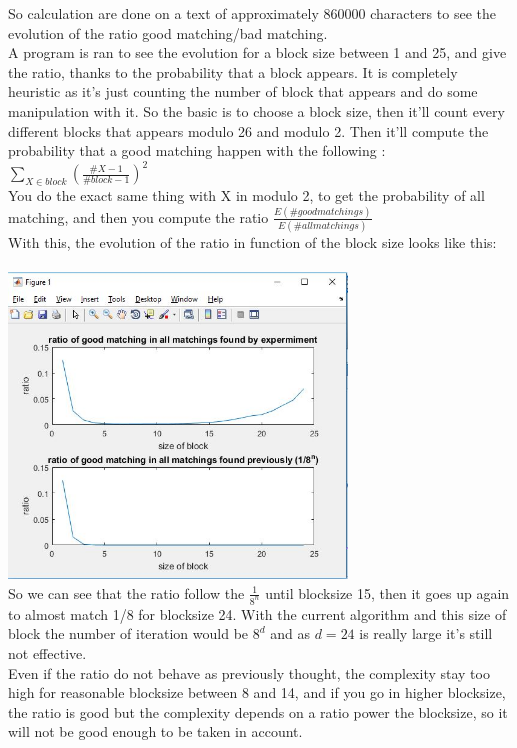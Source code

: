 \documentclass{article}
\begin{document}
So calculation are done on a text of approximately $860000$ characters to see the evolution of the ratio good matching/bad matching.\\
A program is ran to see the evolution for a block size between 1 and 25, and give the ratio, thanks to the probability that a block appears. It is completely heuristic as it's just counting the number of block that appears and do some manipulation with it.
So the basic is to choose a block size, then it'll count every different blocks that appears modulo 26 and modulo 2.
Then it'll compute the probability that a good matching happen with the following : $\sum_{X \in block}({\frac{\#X -1}{\#block -1}})^2 $\\
You do the exact same thing with X in modulo 2, to get the probability of all matching, and then you compute the ratio $\frac{E(\# good matchings)}{E(\# all matchings)}$\\
With this, the evolution of the ratio in function of the block size looks like this:\\
\\
\includegraphics[width=90mm]{ratio.jpg}
\\
So we can see that the ratio follow the $\frac{1}{8^n}$ until blocksize 15, then it goes up again to almost match 1/8 for blocksize 24. With the current algorithm and this size of block the number of iteration would be $8^d$ and as $d = 24$ is really large it's still not effective.\\
Even if the ratio do not behave as previously thought, the complexity stay too high for reasonable blocksize between 8 and 14, and if you go in higher blocksize, the ratio is good but the complexity depends on a ratio power the blocksize, so it will not be good enough to be taken in account.
\end{document}
